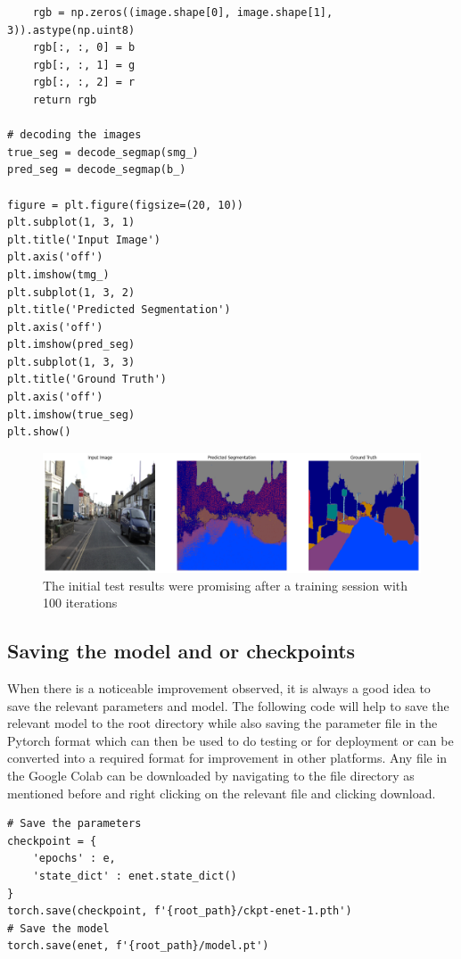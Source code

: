 \begin{enumerate}
\begin{lstlisting}
    rgb = np.zeros((image.shape[0], image.shape[1], 3)).astype(np.uint8)
    rgb[:, :, 0] = b
    rgb[:, :, 1] = g
    rgb[:, :, 2] = r
    return rgb

# decoding the images
true_seg = decode_segmap(smg_)
pred_seg = decode_segmap(b_)

figure = plt.figure(figsize=(20, 10))
plt.subplot(1, 3, 1)
plt.title('Input Image')
plt.axis('off')
plt.imshow(tmg_)
plt.subplot(1, 3, 2)
plt.title('Predicted Segmentation')
plt.axis('off')
plt.imshow(pred_seg)
plt.subplot(1, 3, 3)
plt.title('Ground Truth')
plt.axis('off')
plt.imshow(true_seg)
plt.show()
\end{lstlisting}
          \begin{figure}[H]
              \centering
              \includegraphics[width=450pt]{assets/enet/camvid/out1.png}
              \caption{The initial test results were promising after a training session with 100 iterations}
              \label{fig:using:test4}
          \end{figure}
\end{enumerate}



\subsection*{Saving the model and or checkpoints}
When there is a noticeable improvement observed, it is always a good idea to save the relevant parameters and model. The following code will help to save the relevant model to the root directory while also saving the parameter file in the Pytorch format which can then be used to do testing or for deployment or can be converted into a required format for improvement in other platforms. Any file in the Google Colab can be downloaded by navigating to the file directory as mentioned before and right clicking on the relevant file and clicking download.
\begin{lstlisting}
# Save the parameters
checkpoint = {
    'epochs' : e,
    'state_dict' : enet.state_dict()
}
torch.save(checkpoint, f'{root_path}/ckpt-enet-1.pth')
# Save the model
torch.save(enet, f'{root_path}/model.pt')
\end{lstlisting}

